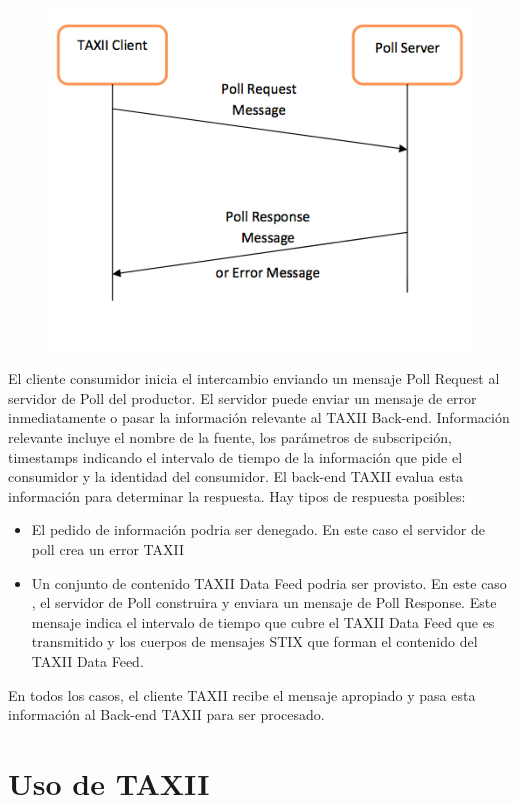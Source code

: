 \begin{figure}[ht!]
  \centering
    \includegraphics[width=150mm]{./Figures/FeedPollExchange.png}
\end{figure}

El cliente consumidor inicia el intercambio enviando un mensaje Poll Request al 
servidor de Poll del productor. El servidor puede enviar un mensaje de error 
inmediatamente o pasar la información relevante al TAXII Back-end. Información 
relevante incluye el nombre de la fuente, los parámetros de subscripción, 
timestamps indicando el intervalo de tiempo de la información que pide el 
consumidor y la identidad del consumidor. El back-end TAXII evalua esta 
información para determinar la respuesta. Hay tipos de respuesta posibles:
\begin{itemize}
  \item El pedido de información podria ser denegado. En este caso el servidor 
  de poll crea un error TAXII 
  \item Un conjunto de contenido TAXII Data Feed podria ser provisto. En este 
  caso , el servidor de Poll construira y enviara un mensaje de Poll Response. 
  Este mensaje indica el intervalo de tiempo que cubre el TAXII Data Feed que es 
  transmitido y los cuerpos de mensajes STIX que forman el contenido del TAXII 
  Data Feed.
\end{itemize}
En todos los casos, el cliente TAXII recibe el mensaje apropiado y pasa esta 
información al Back-end TAXII para ser procesado.

\section{Uso de TAXII}

